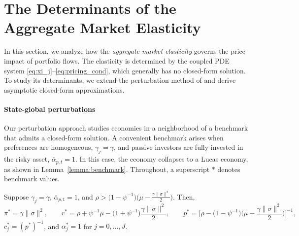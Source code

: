 \section{The Determinants of the Aggregate Market Elasticity}\label{sec:elasticity}

In this section, we analyze how the \emph{aggregate market elasticity} governs the price impact of portfolio flows.  
The elasticity is determined by the coupled PDE system \eqref{eq:xi_j}–\eqref{eq:pricing_cond}, which generally has no closed-form solution. To study its determinants, we extend the perturbation method of \citet{kogan2001risk} and derive asymptotic closed-form approximations.

\paragraph{State-global perturbations}

Our perturbation approach studies economies in a neighborhood of a benchmark that admits a closed-form solution.
A convenient benchmark arises when preferences are homogeneous, $\gamma_j=\gamma$, and passive investors are fully invested in the risky asset, $\overline{\alpha}_{p,t}=1$. In this case, the economy collapses to a Lucas economy, as shown in Lemma~\ref{lemma:benchmark}. Throughout, a superscript $*$ denotes benchmark values.



\begin{lemma}\label{lemma:benchmark}
Suppose $\gamma_j = \gamma$, $\overline{\alpha}_{p,t} = 1$, and $\rho>\big(1-\psi^{-1}\big)\big(\mu - \frac{\gamma \|\sigma\|^2}{2}\big)$. Then, 
\begin{equation}
        \pi^* = \gamma \|\sigma\|^2, \qquad 
        r^* = \rho + \psi^{-1}\mu - \big(1+\psi^{-1}\big)\frac{\gamma \|\sigma\|^2}{2}, \qquad 
        p^* = \Big[\rho - \big(1-\psi^{-1}\big)\Big(\mu - \frac{\gamma \|\sigma\|^2}{2}\Big)\Big]^{-1},
\end{equation}
$c_{j}^* = (p^*)^{-1}$, and $\alpha_{j}^* = 1$ for $j = 0, \ldots, J$.
\end{lemma}

